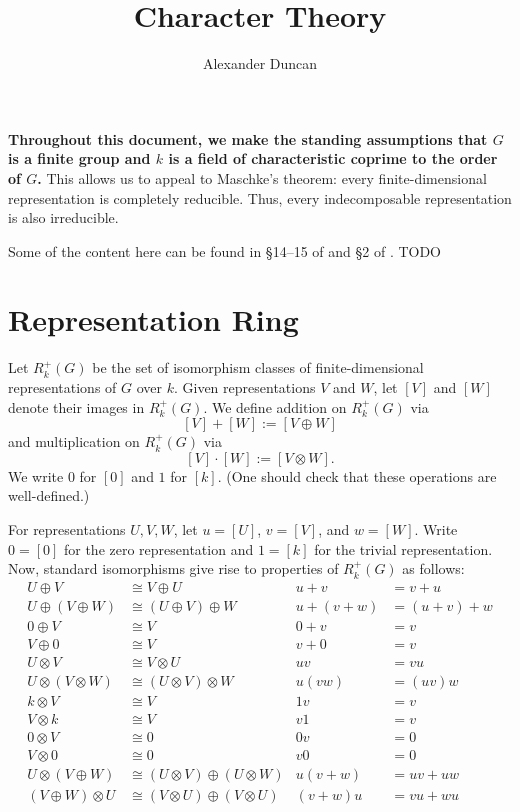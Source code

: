 \documentclass[12pt]{article}
\theoremstyle{plain}
\theoremstyle{definition}
\theoremstyle{remark}
\numberwithin{equation}{section}
\begin{document}
\title{Character Theory}
\author{Alexander Duncan}

\maketitle

{\bf
Throughout this document, we make the standing assumptions that $G$
is a finite group and $k$ is a field of characteristic coprime to the
order of $G$.}
This allows us to appeal to Maschke's theorem:
every finite-dimensional representation is completely reducible.
Thus, every indecomposable representation is also irreducible.

Some of the content here can be found in
\S 14--15 of \cite{AlperinBell} and
\S 2 of \cite{Serre}.
TODO

\section{Representation Ring}

Let $R^+_k(G)$ be the set of isomorphism classes of
finite-dimensional representations of $G$ over $k$.
Given representations $V$ and $W$, let $[V]$ and $[W]$ denote their
images in $R^+_k(G)$.
We define addition on $R^+_k(G)$ via
\[ [V] + [W] := [V \oplus W] \]
and multiplication on $R^+_k(G)$ via
\[ [V] \cdot [W] := [V \otimes W]. \]
We write $0$ for $[0]$ and $1$ for $[k]$.
(One should check that these operations are well-defined.)

For representations $U,V,W$, let $u=[U]$, $v=[V]$, and $w=[W]$.
Write $0 = [0]$ for the zero representation and $1=[k]$
for the trivial representation.
Now, standard isomorphisms give rise to properties of $R^+_k(G)$ as follows:
\begin{align*}
U \oplus V &\cong V \oplus U & u+v&=v+u\\
U \oplus (V \oplus W) &\cong (U \oplus V) \oplus W & u+(v+w)&=(u+v)+w\\
0 \oplus V &\cong V & 0+v&=v\\
V \oplus 0 &\cong V & v+0&=v\\
U \otimes V &\cong V \otimes U & uv&=vu\\
U \otimes (V \otimes W) &\cong (U \otimes V) \otimes W & u(vw)&=(uv)w\\
k \otimes V &\cong V & 1v&=v\\
V \otimes k &\cong V & v1&=v\\
0 \otimes V &\cong 0 & 0v&=0\\
V \otimes 0 &\cong 0 & v0&=0\\
U \otimes (V \oplus W) &\cong (U \otimes V) \oplus (U \otimes W) &
u(v+w)&=uv+uw\\
(V \oplus W) \otimes U &\cong (V \otimes U) \oplus (V \otimes U) &
(v+w)u&=vu+wu
\end{align*}
\end{document}
